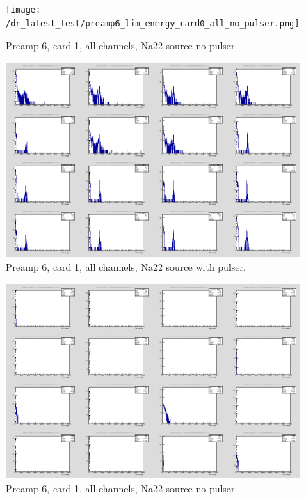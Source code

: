 \documentclass{report}
\begin{document}
\begin{figure}[!htb]
  \texttt{[image: /dr\_latest\_test/preamp6\_lim\_energy\_card0\_all\_no\_pulser.png]}
  \caption{Preamp 6, card 1, all channels, Na22 source  no pulser.}
\end{figure}
\begin{figure}[!htb]
  \includegraphics[width=\linewidth]{dr_latest_test/preamp6_lim_energy_card0_pulser.png}
  \caption{Preamp 6, card 1, all channels, Na22 source with pulser.}
\end{figure}
\begin{figure}[!htb]
  \includegraphics[width=\linewidth]{dr_latest_test/preamp6_lim_energy_card1_all_no_pulser.png}
  \caption{Preamp 6, card 1, all channels, Na22 source  no pulser.}
\end{figure}
\end{document}
